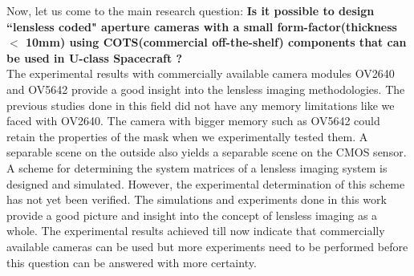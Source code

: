 Now, let us come to the main research question:
\textbf{Is it possible to design ``lensless coded" aperture cameras with a small form-factor(thickness $<$ 10mm) using COTS(commercial off-the-shelf) components that can be used in U-class Spacecraft ?}\\
The experimental results with commercially available camera modules OV2640 and OV5642 provide a good insight into the lensless imaging methodologies. The previous studies done in this field did not have any memory limitations like we faced with OV2640. The camera with bigger memory such as OV5642 could retain the properties of the mask when we experimentally tested them. A separable scene on the outside also yields a separable scene on the CMOS sensor. A scheme for determining the system matrices of a lensless imaging system is designed and simulated. However, the experimental determination of this scheme has not yet been verified. The simulations and experiments done in this work provide a good picture and insight into the concept of lensless imaging as a whole. The experimental results achieved till now indicate that commercially available cameras can be used but more experiments need to be performed before this question can be answered with more certainty. 

